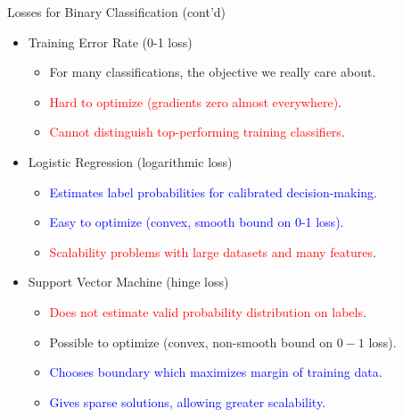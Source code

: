\documentclass[10pt,mathserif]{beamer}
\begin{document}
\begin{frame}{Losses for Binary Classification (cont'd)}
\begin{itemize}
\item Training Error Rate (0-1 loss) 
\begin{itemize}
    \item For many classifications, the objective we really care about.
    \item \textcolor{red}{Hard to optimize (gradients zero almost everywhere)}.
    \item \textcolor{red}{Cannot distinguish top-performing training classifiers}.
\end{itemize}

\item  Logistic Regression (logarithmic loss)
\begin{itemize}
    \item \textcolor{blue}{Estimates label probabilities for calibrated decision-making}.
    \item \textcolor{blue}{Easy to optimize (convex, smooth bound on 0-1 loss)}.
    \item \textcolor{red}{Scalability problems with large datasets and many features}.
\end{itemize}

\item Support Vector Machine (hinge loss)
\begin{itemize}
    \item \textcolor{red}{Does not estimate valid probability distribution on labels}.
    \item Possible to optimize (convex, non-smooth bound on $0-1$ loss).
    \item \textcolor{blue}{Chooses boundary which maximizes margin of training data}.
    \item \textcolor{blue}{Gives sparse solutions, allowing greater scalability}.
\end{itemize}    
\end{itemize}
\end{frame}
\end{document}
